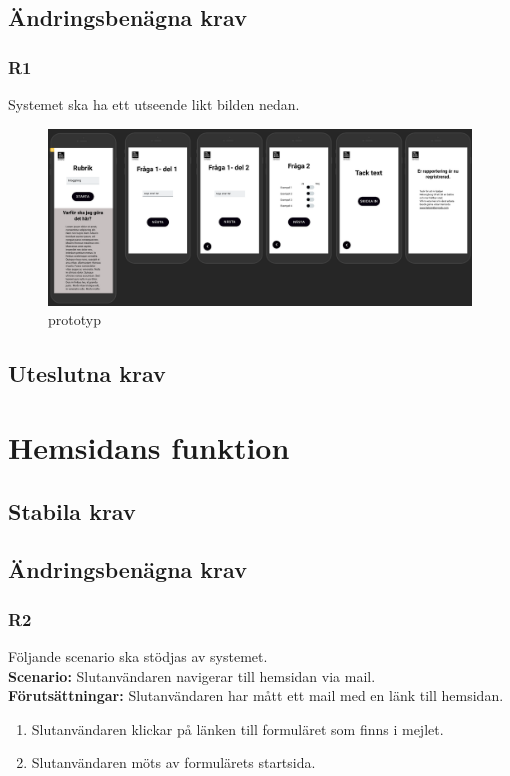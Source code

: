 \documentclass{article}
\begin{document}
    \subsection*{Ändringsbenägna krav}
     \subsubsection*{R1}
    Systemet ska ha ett utseende likt bilden nedan.
    
    \begin{figure}[h!]
    \includegraphics[width=150mm]{prototyp.png}
     \caption{prototyp}
    \end{figure}
    \subsection*{Uteslutna krav}
    
    \section{Hemsidans funktion}
    
    \subsection*{Stabila krav}
    \subsection*{Ändringsbenägna krav}
    
      \subsubsection*{R2}
    Följande scenario ska stödjas av systemet.
        \\
       \indent \textbf{Scenario:} Slutanvändaren navigerar till hemsidan via mail.
        \\
       \indent \textbf{Förutsättningar:} Slutanvändaren har mått ett mail med en länk till hemsidan.
            \begin{enumerate}
                \item Slutanvändaren klickar på länken till formuläret som finns i mejlet.
                \item Slutanvändaren möts av formulärets startsida.
            \end{enumerate}
            
\end{document}
